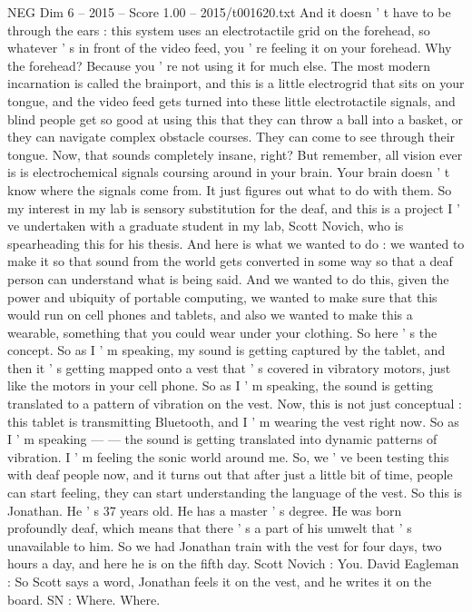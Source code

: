 \begin{textsample}{NEG Dim 6 – 2015 – Score 1.00 – 2015/t001620.txt}
And it doesn ' t have to be through the ears : this system uses an electrotactile grid on the forehead, so whatever ' s in front of the video feed, you ' re feeling it on your forehead.
Why the forehead?
Because you ' re not using it for much else.
The most modern incarnation is called the brainport, and this is a little electrogrid that sits on your tongue, and the video feed gets turned into these little electrotactile signals, and blind people get so good at using this that they can throw a ball into a basket, or they can navigate complex obstacle courses.
They can come to see through their tongue.
Now, that sounds completely insane, right?
But remember, all vision ever is is electrochemical signals coursing around in your brain.
Your brain doesn ' t know where the signals come from.
It just figures out what to do with them.
So my interest in my lab is sensory substitution for the deaf, and this is a project I ' ve undertaken with a graduate student in my lab, Scott Novich, who is spearheading this for his thesis.
And here is what we wanted to do : we wanted to make it so that sound from the world gets converted in some way so that a deaf person can understand what is being said.
And we wanted to do this, given the power and ubiquity of portable computing, we wanted to make sure that this would run on cell phones and tablets, and also we wanted to make this a wearable, something that you could wear under your clothing.
So here ' s the concept.
So as I ' m speaking, my sound is getting captured by the tablet, and then it ' s getting mapped onto a vest that ' s covered in vibratory motors, just like the motors in your cell phone.
So as I ' m speaking, the sound is getting translated to a pattern of vibration on the vest.
Now, this is not just conceptual : this tablet is transmitting Bluetooth, and I ' m wearing the vest right now.
So as I ' m speaking — — the sound is getting translated into dynamic patterns of vibration.
I ' m feeling the sonic world around me.
So, we ' ve been testing this with deaf people now, and it turns out that after just a little bit of time, people can start feeling, they can start understanding the language of the vest.
So this is Jonathan.
He ' s 37 years old.
He has a master ' s degree.
He was born profoundly deaf, which means that there ' s a part of his umwelt that ' s unavailable to him.
So we had Jonathan train with the vest for four days, two hours a day, and here he is on the fifth day.
Scott Novich : You.
David Eagleman : So Scott says a word, Jonathan feels it on the vest, and he writes it on the board.
SN : Where.
Where.

\end{textsample}

